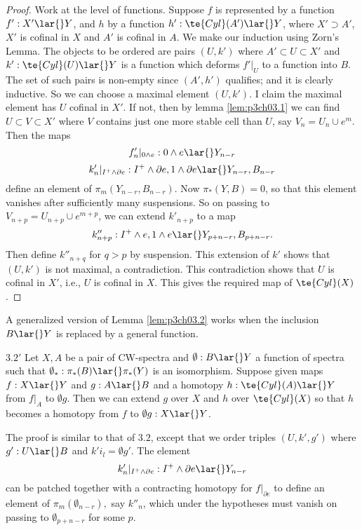 \documentclass[../main]{subfiles}
\begin{document}
\begin{proof}
Work at the level of functions. Suppose $f$ is represented by a function $f':X'\lar{}Y$, and $h$ by a function $h':\te{Cyl}(A')\lar{}Y$, where $X'\supset A'$, $X'$ is cofinal in $X$ and $A'$ is cofinal in $A$. We make our induction using Zorn's Lemma. The objects to be ordered are pairs $(U,k')$ where $A'\subset U\subset X'$ and $k':\te{Cyl}(U)\lar{} Y$ is a function which deforms $f'|_U$ to a function into $B$. 
The set of such pairs is non-empty since $(A',h')$ qualifies; and it is clearly inductive. So we can choose a
maximal element $(U,k')$. I claim the maximal element has $U$ cofinal
in $X'$. If not, then by lemma \ref{lem:p3ch03.1} we can find $U\subset V\subset X'$ where $V$ contains just one more stable cell than $U$, say $V_n=U_n\cup e^m$. Then the maps \[f'_n|_{0\wedge e}: 0\wedge e\lar{} Y_{n-r} \]
\[k_n'|_{I^+ \wedge \partial e}: I^+ \wedge \partial e, 1\wedge \partial e\lar{} Y_{n-r},B_{n-r} \]
define an element of $\pi_m(Y_{n-r},B_{n-r})$. Now $\pi_\ast(Y,B)=0$, so that this element vanishes after sufficiently many suspensions. So on passing to $V_{n+p}= U_{n+p}\cup e^{m+p}$, we can extend $k'_{n+p}$ to a map \[k''_{n+p}: I^+\wedge e, 1\wedge e \lar{} Y_{p+n-r},B_{p+n-r}. \]
Then define $k''_{n+q}$ for $q>p$ by suspension. This extension of $k'$ shows that $(U,k')$ is not maximal, a contradiction. This contradiction shows that $U$ is cofinal in $X'$, i.e., $U$ is cofinal in $X$. This gives the required map of $\te{Cyl}(X)$.
\end{proof}
A generalized version of Lemma \ref{lem:p3ch03.2} works when the inclusion $B\lar{}Y$ is replaced by a general function. 

\begin{customlemma}{$3.2'$} \label{lem:p3ch03.2'}
Let $X,A$ be a pair of CW-spectra and $\emptyset: B\lar{}  Y$ a function of spectra such that $\emptyset_\ast:\pi_\ast (B)\lar{}\pi_\ast(Y)$ is an isomorphism. Suppose given maps $f:X\lar{}Y$ and $g:A\lar{}B$ and a homotopy $h:\te{Cyl}(A)\lar{}Y$ from $f|_A$ to $\emptyset g$. Then we can extend $g$ over $X$ and $h$ over $\te{Cyl}(X)$ so that $h$ becomes a homotopy from $f$ to $\emptyset g:X\lar{}Y$.
\end{customlemma}
The proof is similar to that of $3.2$, except that we order triples $(U,k',g')$ where $g':U\lar{}B$ and $k' i_l = \emptyset g'$. The element \[k'_n|_{I^+\wedge \partial e}: I^+\wedge \partial e\lar{} Y_{n-r}\]
can be patched together with a contracting homotopy for $f|_{\partial e}$ to define an element of $\pi_m(\emptyset_{n-r}),$ say $k''_n$, which under the hypotheses must vanish on passing to $\emptyset_{p+n-r}$ for some $p$.
\end{document}
